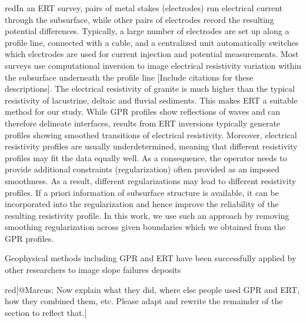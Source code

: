 \documentclass[utf8]{frontiersSCNS}
\newcommand{\alon}{\begin{color}{red}}
\newcommand{\aloff}{\end{color}}
\begin{document}
\alon In an ERT survey, pairs of metal stakes (electrodes) run electrical current through the subsurface, while other pairs of electrodes record the resulting potential differences. Typically, a large number of electrodes are set up along a profile line, connected with a cable, and a centralized unit automatically switches which electrodes are used for current injection and potential measurements. Most surveys use computational inversion to image electrical resistivity variation within the subsurface underneath the profile line [Include citations for these descriptions]. The electrical resistivity of granite is much higher than the typical resistivity of lacustrine, deltaic and fluvial sediments. This makes ERT a suitable method for our study. While GPR profiles show reflections of waves and can therefore delineate interfaces, results from ERT inversions typically generate profiles showing smoothed transitions of electrical resistivity. Moreover, electrical resistivity profiles are usually underdetermined, meaning that different resistivity profiles may fit the data equally well. As a consequence, the operator needs to provide additional constraints (regularization) often provided as an imposed smoothness. As a result, different regularizations may lead to different resistivity profiles. If a priori information of subsurface structure is available, it can be incorporated into the regularization and hence improve the reliability of the resulting resistivity profile. In this work, we use such an approach by removing smoothing regularization across given boundaries which we obtained from the GPR profiles.
\aloff

Geophysical methods including GPR and ERT have been successfully applied by other researchers to image slope failures deposits \citep[e.g.][]{sass2006determination, otto2006comparing,socco2010geophysical,brody2015near,liu2018near} \alon[@Marcus: Now explain what they did, where else people used GPR and ERT, how they combined them, etc. Please adapt and rewrite the remainder of the section to reflect that.]\aloff
\end{document}
